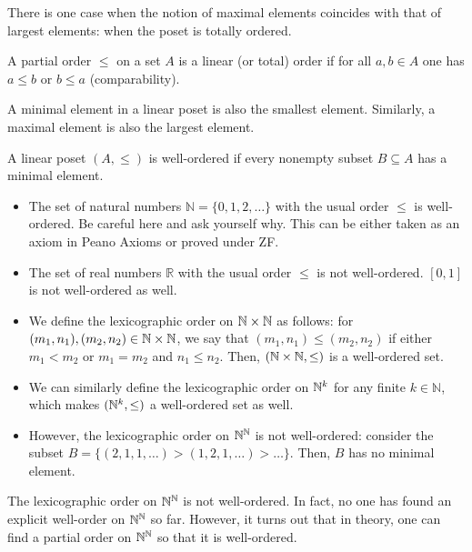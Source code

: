   There is one case when the notion of maximal elements coincides with that of largest elements: when the poset is totally ordered.

  \begin{definition}
  A partial order $\le$ on a set $A$ is a linear (or total) order if for all $a,b\in A$ one has $a\le b$ or $b\le a$ (comparability).
  \end{definition}

  \begin{remark}
    A minimal element in a linear poset is also the smallest element. Similarly, a maximal element is also the largest element.
  \end{remark}

  

  \begin{definition}
A linear poset $(A,\le)$ is well-ordered if every nonempty subset
$B\subseteq A$ has a minimal element.
\end{definition}

\begin{example}
  \begin{itemize}
    \item The set of natural numbers $\mathbb{N}=\{0,1,2,\ldots\}$ with the usual order $\leq$ is well-ordered. Be careful here and ask yourself why. This can be either taken as an axiom in Peano Axioms  or proved under ZF.
    \item The set of real numbers $\mathbb{R}$ with the usual order $\leq$ is not well-ordered. $[0,1]$ is not well-ordered as well.
  \end{itemize}
\end{example}

\begin{example}
  \begin{itemize}
    \item We define the lexicographic order on $\mathbb{N}\times \mathbb{N}$ as follows: for $(m_1,n_1),(m_2,n_2)\in \mathbb{N}\times \mathbb{N}$, we say that $(m_1,n_1)\leq (m_2,n_2)$ if either $m_1<m_2$ or $m_1=m_2$ and $n_1\leq n_2$. Then, $(\mathbb{N}\times \mathbb{N},\leq)$ is a well-ordered set.
    \item We can similarly define the lexicographic order on $\mathbb{N}^k$ for any finite $k\in\mathbb{N}$, which makes $(\mathbb{N}^k,\leq)$ a well-ordered set as well.
    \item However, the lexicographic order on $\mathbb{N}^{\mathbb{N}}$ is not well-ordered: consider the subset $B=\{(2,1,1,\ldots)>(1,2,1,\ldots)>\ldots\}$. Then, $B$ has no minimal element.
  \end{itemize}

The lexicographic order on $\mathbb{N}^{\mathbb{N}}$ is not well-ordered. In fact, no one has found an explicit well-order on $\mathbb{N}^{\mathbb{N}}$ so far. However, it turns out that in theory, one can find a partial order on $\mathbb{N}^{\mathbb{N}}$ so that it is well-ordered.
\end{example}

